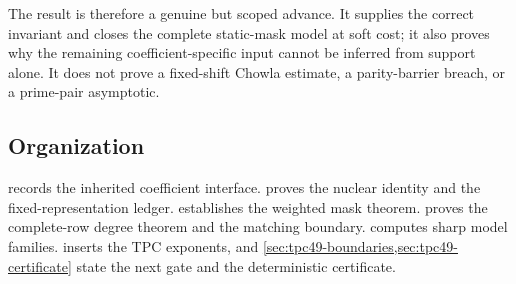 The result is therefore a genuine but scoped advance.  It supplies the
correct invariant and closes the complete static-mask model at soft
cost; it also proves why the remaining coefficient-specific input
cannot be inferred from support alone.  It does not prove a
fixed-shift Chowla estimate, a parity-barrier breach, or a prime-pair
asymptotic.

\subsection{Organization}

 records the inherited coefficient interface.
 proves the nuclear identity and the
fixed-representation ledger.  
establishes the weighted mask theorem.  
proves the complete-row degree theorem and the matching boundary.
 computes sharp model families.
 inserts the TPC exponents, and
\cref{sec:tpc49-boundaries,sec:tpc49-certificate} state the next gate
and the deterministic certificate.
